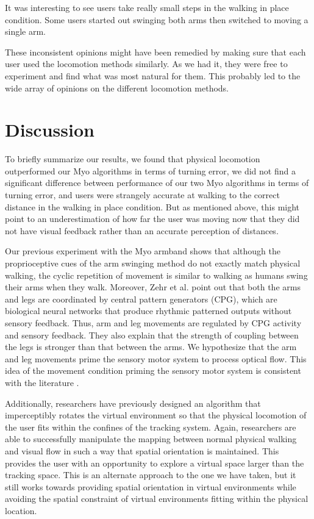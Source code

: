 \documentclass[titlepage]{article}
\theoremstyle{definition}
\theoremstyle{proof}
\begin{document}
It was interesting to see users take really small steps in the walking in place condition.
Some users started out swinging both arms then switched to moving a single arm.

These inconsistent opinions might have been remedied by making sure that each
user used the locomotion methods similarly.
As we had it, they were free to experiment and find what was most natural for them.
This probably led to the wide array of opinions on the different locomotion methods.

\newpage
\section{Discussion}
To briefly summarize our results,
we found that physical locomotion outperformed our Myo algorithms in terms of turning error,
we did not find a significant difference between performance of our two Myo algorithms in terms of turning error,
and users were strangely accurate at walking to the correct distance in the walking in place condition.
But as mentioned above, this might point to an underestimation of how far the user was moving
now that they did not have visual feedback rather than an accurate perception of distances.

Our previous experiment \cite{previousMYO} with the Myo armband shows that although the
proprioceptive cues of the arm swinging method do not exactly match physical walking,
the cyclic repetition of movement is similar to walking
as humans swing their arms when they walk.
Moreover, Zehr et al. \cite{zehr} point out that both the arms and legs are coordinated by central pattern generators (CPG),
which are biological neural networks that produce rhythmic patterned outputs without sensory feedback.
Thus, arm and leg movements are regulated
by CPG activity and sensory feedback.
They also explain that the
strength of coupling between the legs is stronger than that between the arms.
We hypothesize that the arm and leg movements prime the sensory motor system to process optical flow.
This idea of the movement condition priming the sensory motor system is consistent with the literature
\cite{Engel:2008VRST,Nitzsche2004:Presence,Razzaque2001:Eurographics,Steinicke:2010,Williams2006:APGV}.

Additionally, researchers \cite{Engel:2008VRST,Nitzsche2004:Presence,Razzaque2001:Eurographics,Steinicke:2010}
have previously designed an algorithm
that imperceptibly rotates the virtual environment so that the physical locomotion of the user fits within the
confines of the tracking system.
Again, researchers are able to successfully manipulate the mapping between normal physical walking
and visual flow in such a way that spatial orientation is maintained.
This provides the user with an opportunity to explore a virtual space
larger than the tracking space.
This is an alternate approach to the one we have taken,
but it still works towards providing spatial orientation in virtual environments
while avoiding the spatial constraint of virtual environments fitting within the physical location.
\end{document}
